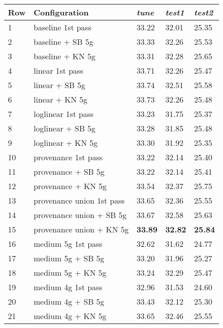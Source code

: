 \begin{table}
  \begin{center}
    \begin{tabular}{l|l|lll}
      Row & Configuration         & \emph{tune} & \emph{test1} & \emph{test2} \\
      \hline
      1 & baseline 1st pass & 33.22 & 32.01 & 25.35 \\
      2 & baseline + SB 5g                 & 33.33 & 32.26 & 25.53 \\
      3 & baseline + KN 5g                 & 33.31 & 32.28 & 25.65 \\
      \hline
      4 & linear 1st pass & 33.71 & 32.26 & 25.47 \\
      5 & linear + SB 5g               & 33.74 & 32.51 & 25.58 \\
      6 & linear + KN 5g               & 33.73 & 32.26 & 25.48 \\
      \hline
      7 & loglinear 1st pass      & 33.23 & 31.75 & 25.37 \\
      8 & loglinear + SB 5g                 & 33.28 & 31.85 & 25.48 \\
      9 & loglinear + KN 5g                 & 33.30 & 31.92 & 25.35 \\
      \hline
      10 & provenance 1st pass              & 33.22 & 32.14 & 25.40 \\
      11 & provenance + SB 5g                 & 33.22 & 32.14 & 25.41 \\
      12 & provenance + KN 5g                 & 33.54 & 32.37 & 25.75 \\
      \hline
      13 & provenance union 1st pass        & 33.65 & 32.36 & 25.55 \\
      14 & provenance union + SB 5g                 & 33.67 & 32.58 & 25.63 \\
      15 & provenance union + KN 5g                 & \textbf{33.89} & \textbf{32.82} & \textbf{25.84} \\
      \hline
      16 & medium 5g 1st pass  & 32.62 & 31.62 & 24.77 \\
      17 & medium 5g + SB 5g                 & 33.20 & 31.96 & 25.27 \\
      18 & medium 5g + KN 5g                 & 33.24 & 32.29 & 25.47 \\
      \hline
      19 & medium 4g 1st pass  & 32.96 & 31.53 & 24.60 \\
      20 & medium 4g + SB 5g                 & 33.43 & 32.12 & 25.30 \\
      21 & medium 4g + KN 5g                 & 33.65 & 32.46 & 25.55 \\

\end{tabular}
\end{center}
\end{table}
